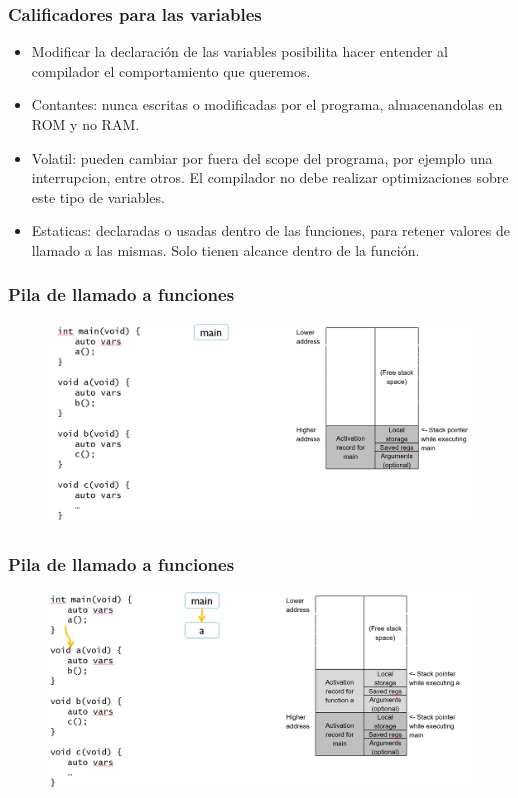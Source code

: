 \documentclass[10.5pt,scale=1.0,t,aspectratio=169,hyperref={pdfpagelabels=false}]{beamer}
\begin{document}
\begin{frame}
	\frametitle{Calificadores para las variables}
	\begin{itemize}
		\item Modificar la declaración de las variables posibilita hacer entender al compilador el comportamiento que queremos.
		\item Contantes: nunca escritas o modificadas por el programa, almacenandolas en ROM y no RAM.
		\item Volatil: pueden cambiar por fuera del scope del programa, por ejemplo una interrupcion, entre otros. El compilador no debe realizar optimizaciones sobre este tipo de variables.
		\item Estaticas: declaradas o usadas dentro de las funciones, para retener valores de llamado a las mismas. Solo tienen alcance dentro de la función.
	\end{itemize}
\end{frame}
\begin{frame}
	\frametitle{Pila de llamado a funciones}
	\begin{figure}
		\centering
		\includegraphics[scale=0.4]{StackFunction1}
	\end{figure}
\end{frame}
\begin{frame}
	\frametitle{Pila de llamado a funciones}
	\begin{figure}
		\centering
		\includegraphics[scale=0.4]{StackFunction2}
	\end{figure}
\end{frame}
\end{document}
